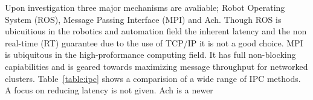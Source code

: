 Upon investigation three major mechanisms are avaliable; Robot Operating System (ROS)\cite{ros}, Message Passing Interface (MPI)\cite{Gropp:1999:UMP:330577} and Ach\cite{ach}.
Though ROS is ubicuitious in the robotics and automation field the inherent latency and the non real-time (RT) guarantee due to the use of TCP/IP it is not a good choice.
MPI is ubiquitous in the high-proformance computing field.  It has full non-blocking capiabilities and is geared towards maximizing message throughput for networked clusters\cite{ach}.
Table~\ref{table:ipc} shows a comparision of a wide range of IPC methods.
A focus on reducing latency is not given.
Ach is a newer 



